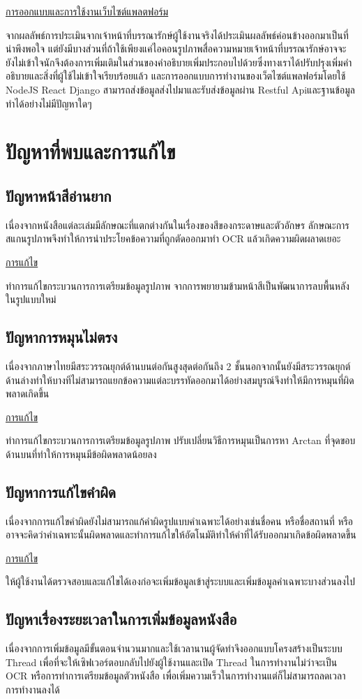 \underline{การออกแบบและการใช้งานเว็บไซต์แพลตฟอร์ม}

จากผลลัพธ์การประเมินจากเจ้าหน้าที่บรรณารักษ์ผู้ใช้งานจริงได้ประเมินผลลัพธ์ค่อนข้างออกมาเป็นที่น่าพึงพอใจ แต่ยังมีบางส่วนที่ถ้าใช้เพียงแค่ไอคอนรูปภาพสื่อความหมายเจ้าหน้าที่บรรณารักษ์อาจจะ
ยังไม่เข้าใจนักจึงต้องการเพิ่มเติมในส่วนของคำอธิบายเพิ่มประกอบไปด้วยซึ่งทางเราได้ปรับปรุงเพิ่มคำอธิบายและสิ่งที่ผู้ใช้ไม่เข้าใจเรียบร้อยแล้ว
และการออกแบบการทำงานของเว็ตไซต์แพลฟอร์มโดยใช้ NodeJS React Django สามารถส่งข้อมูลส่งไปมาและรับส่งข้อมูลผ่าน Restful Apiและฐานข้อมูลทำได้อย่างไม่มีปัญหาใดๆ

\section{ปัญหาที่พบและการแก้ไข}
\subsection{ปัญหาหน้าสีอ่านยาก}
เนื่องจากหนังสือแต่ละเล่มมีลักษณะที่แตกต่างกันในเรื่องของสีของกระดาษและตัวอักษร ลักษณะการสแกนรูปภาพจึงทำให้การนำประโยคข้อความที่ถูกตัดออกมาทำ OCR แล้วเกิดความผิดผลาดเยอะ

\underline{การแก้ไข}

	ทำการแก้ไขกระบวนการการเตรียมข้อมูลรูปภาพ จากการพยายามข้ามหน้าสีเป็นพัฒนาการลบพื้นหลังในรูปแบบใหม่
\subsection{ปัญหาการหมุนไม่ตรง}
เนื่องจากภาษาไทยมีสระวรรณยุกต์ด้านบนต่อกันสูงสุดต่อกันถึง 2 ชั้นนอกจากนั้นยังมีสระวรรณยุกต์ด้านล่างทำให้บางทีไม่สามารถแยกข้อความแต่ละบรรทัดออกมาได้อย่างสมบูรณ์จึงทำให้มีการหมุนที่ผิดพลาดเกิดขึ้น

\underline{การแก้ไข}

	ทำการแก้ไขกระบวนการการเตรียมข้อมูลรูปภาพ ปรับเปลี่ยนวิธีการหมุนเป็นการหา Arctan ที่จุดขอบด้านบนที่ทำให้การหมุนมีข้อผิดพลาดน้อยลง
\subsection{ปัญหาการแก้ไขคำผิด}
เนื่องจากการแก้ไขคำผิดยังไม่สามารถแก้คำผิดรูปแบบคำเฉพาะได้อย่างเช่นชื่อคน หรือชื่อสถานที่ หรืออาจจะคิดว่าคำเฉพาะนั้นผิดพลาดและทำการแก้ไขให้อัตโนมัติทำให้คำที่ได้รับออกมาเกิดข้อผิดพลาดขึ้น

\underline{การแก้ไข}

	ให้ผู้ใช้งานได้ตรวจสอบและแก้ไขได้เองก่อจะเพิ่มข้อมูลเข้าสู่ระบบและเพิ่มข้อมูลคำเฉพาะบางส่วนลงไป
\subsection{ปัญหาเรื่องระยะเวลาในการเพิ่มข้อมูลหนังสือ}
เนื่องจากการเพิ่มข้อมูลมีขั้นตอนจำนวนมากและใช้เวลานานผู้จัดทำจึงออกแบบโครงสร้างเป็นระบบ Thread เพื่อที่จะให้เซิฟเวอร์ตอบกลับไปยังผู้ใช้งานและเปิด Thread ในการทำงานไม่ว่าจะเป็น OCR หรือการทำการเตรียมข้อมูลตัวหนังสือ เพื่อเพิ่มความเร็วในการทำงานแต่ก็ไม่สามารถลดเวลาการทำงานลงได้

